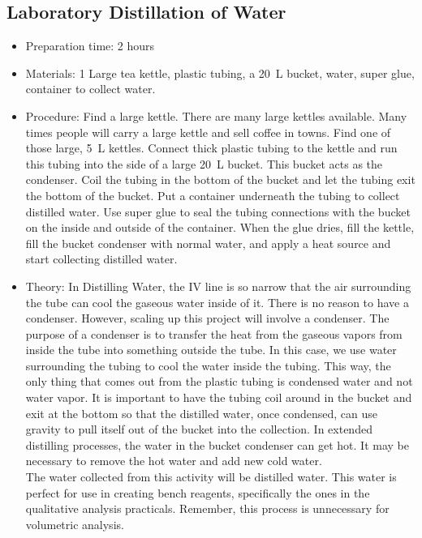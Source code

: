 \subsection{Laboratory Distillation of Water}
\begin{itemize}
\item{Preparation time: 2 hours}
\item{Materials: 1 Large tea kettle, plastic tubing, a 20~L bucket, water, super glue, container to collect water.}
\item{Procedure: Find a large kettle. There are many large kettles available. Many times people will carry a large kettle and sell coffee in towns. Find one of those large, 5~L kettles. Connect thick plastic tubing to the kettle and run this tubing into the side of a large 20~L bucket. This bucket acts as the condenser. Coil the tubing in the bottom of the bucket and let the tubing exit the bottom of the bucket. Put a container underneath the tubing to collect distilled water. Use super glue to seal the tubing connections with the bucket on the inside and outside of the container. When the glue dries, fill the kettle, fill the bucket condenser with normal water, and apply a heat source and start collecting distilled water.}
\item{Theory: In Distilling Water, the IV line is so narrow that the air surrounding the tube can cool the gaseous water inside of it. There is no reason to have a condenser. However, scaling up this project will involve a condenser. The purpose of a condenser is to transfer the heat from the gaseous vapors from inside the tube into something outside the tube. In this case, we use water surrounding the tubing to cool the water inside the tubing. This way, the only thing that comes out from the plastic tubing is condensed water and not water vapor. It is important to have the tubing coil around in the bucket and exit at the bottom so that the distilled water, once condensed, can use gravity to pull itself out of the bucket into the collection. In extended distilling processes, the water in the bucket condenser can get hot. It may be necessary to remove the hot water and add new cold water.\\
The water collected from this activity will be distilled water. This water is perfect for use in creating bench reagents, specifically the ones in the qualitative analysis practicals. Remember, this process is unnecessary for volumetric analysis.}
\end{itemize}

